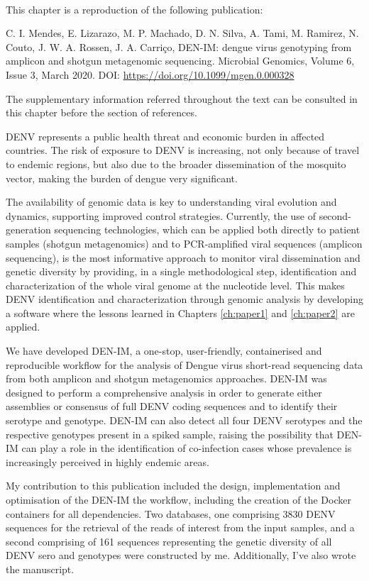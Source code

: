 \mbox{}\\
\vspace{8cm}

This chapter is a reproduction of the following publication:

C. I. Mendes, E. Lizarazo, M. P. Machado, D. N. Silva, A. Tami, M. Ramirez, N. Couto, J. W. A. Rossen, J. A. Carriço, DEN-IM: dengue virus genotyping from amplicon and shotgun metagenomic sequencing. Microbial Genomics, Volume 6, Issue 3, March 2020. DOI: \url{https://doi.org/10.1099/mgen.0.000328}

The supplementary information referred throughout the text can be consulted in this chapter before the section of references. 

\ac{DENV} represents a public health threat and economic burden in affected countries. The risk of exposure to \ac{DENV} is increasing, not only because of travel to endemic regions, but also due to the broader dissemination of the mosquito vector, making the burden of dengue very significant. 

The availability of genomic data is key to understanding viral evolution and dynamics, supporting improved control strategies. Currently, the use of second-generation sequencing technologies, which can be applied both directly to patient samples (shotgun metagenomics) and to PCR-amplified viral sequences (amplicon sequencing), is the most informative approach to monitor viral dissemination and genetic diversity by providing, in a single methodological step, identification and characterization of the whole viral genome at the nucleotide level. This makes \ac{DENV} identification and characterization through genomic analysis by developing a software where the lessons learned in Chapters \ref{ch:paper1} and \ref{ch:paper2} are applied.

We have developed DEN-IM, a one-stop, user-friendly, containerised and reproducible workflow for the analysis of Dengue virus short-read sequencing data from both amplicon and shotgun metagenomics approaches. DEN-IM was designed to perform a comprehensive analysis in order to generate either assemblies or consensus of full DENV coding sequences and to identify their serotype and genotype. DEN-IM can also detect all four DENV serotypes and the respective genotypes present in a spiked sample, raising the possibility that DEN-IM can play a role in the identification of co-infection cases whose prevalence is increasingly perceived in highly endemic areas. 

My contribution to this publication included the design, implementation and optimisation of the DEN-IM the workflow, including the creation of  the Docker containers for all dependencies. Two databases, one comprising 3830 \ac{DENV} sequences for the retrieval of the reads of interest from the input samples, and a second comprising of 161 sequences representing the genetic diversity of all \ac{DENV} sero and genotypes were constructed by me.  Additionally, I've also wrote the manuscript.


